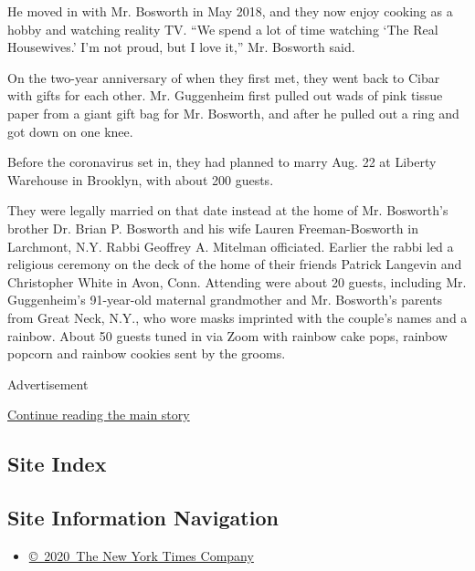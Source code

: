 He moved in with Mr. Bosworth in May 2018, and they now enjoy cooking as
a hobby and watching reality TV. ``We spend a lot of time watching `The
Real Housewives.' I'm not proud, but I love it,'' Mr. Bosworth said.

On the two-year anniversary of when they first met, they went back to
Cibar with gifts for each other. Mr. Guggenheim first pulled out wads of
pink tissue paper from a giant gift bag for Mr. Bosworth, and after he
pulled out a ring and got down on one knee.

Before the coronavirus set in, they had planned to marry Aug. 22 at
Liberty Warehouse in Brooklyn, with about 200 guests.

They were legally married on that date instead at the home of Mr.
Bosworth's brother Dr. Brian P. Bosworth and his wife Lauren
Freeman-Bosworth in Larchmont, N.Y. Rabbi Geoffrey A. Mitelman
officiated. Earlier the rabbi led a religious ceremony on the deck of
the home of their friends Patrick Langevin and Christopher White in
Avon, Conn. Attending were about 20 guests, including Mr. Guggenheim's
91-year-old maternal grandmother and Mr. Bosworth's parents from Great
Neck, N.Y., who wore masks imprinted with the couple's names and a
rainbow. About 50 guests tuned in via Zoom with rainbow cake pops,
rainbow popcorn and rainbow cookies sent by the grooms.

Advertisement

\protect\hyperlink{after-bottom}{Continue reading the main story}

\hypertarget{site-index}{%
\subsection{Site Index}\label{site-index}}

\hypertarget{site-information-navigation}{%
\subsection{Site Information
Navigation}\label{site-information-navigation}}

\begin{itemize}
\tightlist
\item
  \href{https://help.nytimes3xbfgragh.onion/hc/en-us/articles/115014792127-Copyright-notice}{©~2020~The
  New York Times Company}
\end{itemize}

